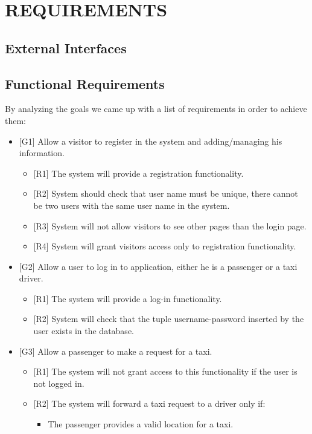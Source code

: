 \section{REQUIREMENTS}
\subsection{External Interfaces}

\subsection{Functional Requirements}
By analyzing the goals we came up with a list of requirements in order to achieve them:
	\begin{itemize}
		\item {[G1]} Allow a visitor to register in the system and adding/managing his information.
			\begin{itemize}
				\item {[R1]} The system will provide a registration functionality.
				\item {[R2]} System should check that user name must be unique, there cannot be two users with the same user name in the system.
				\item {[R3]} System will not allow visitors to see other pages than the login page.
				\item {[R4]} System will grant visitors access only to registration functionality.
			\end{itemize}
		\item {[G2]} Allow a user to log in to application, either he is a passenger or a taxi driver.
			\begin{itemize}
				\item {[R1]} The system will provide a log-in functionality.
				\item {[R2]} System will check that the tuple username-password inserted by the user exists in the database.
			\end{itemize}
		\item {[G3]} Allow a passenger to make a request for a taxi.
	\begin{itemize}
		\item {[R1]} The system will not grant access to this functionality if the user is not logged in.
		\item {[R2]} The system will forward a taxi request to a driver only if:
		\begin{itemize}
			\item The passenger provides a valid location for a taxi.

\end{itemize}
\end{itemize}
\end{itemize}
